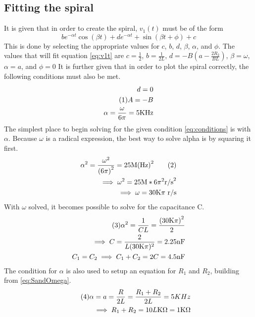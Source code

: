 \documentclass[conference]{IEEEtran}
\newcommand\numberthis{\addtocounter{equation}{1}\tag{\theequation}}
\begin{document}
\subsection{Fitting the spiral}
It is given that in order to create the spiral, $v_1(t)$ must be of the form
\begin{equation}
    be^{-\alpha{t}}\cos(\beta{t}) + de^{-\alpha{t}} + \sin(\beta{t} + \phi) + c
\end{equation}
This is done by selecting the appropriate values for $c$, $b$, $d$, $\beta$, $\alpha$, and $\phi$. The values that will fit equation \ref{eq:v1t} are $c = \frac{1}{2}$, $b = \frac{1}{2L}$, $d = -B\left(a - \frac{2R_2}{BL}\right)$, $\beta = \omega$, $\alpha = a$, and $\phi = 0$
It is further given that in order to plot the spiral correctly, the following conditions must also be met.
\begin{align*}
    d = 0\\ \numberthis \label{eq:conditions}
    A = -B\\
    \alpha = \frac{\omega}{6\pi} = 5\text{KHz}
\end{align*}
The simplest place to begin solving for the given condition \eqref{eq:conditions} is with $\alpha$. Because $\omega$ is a radical expression, the best way to solve alpha is by squaring it first.
\begin{align*}
    \alpha^2 = \frac{\omega^2}{\left(6\pi\right)^2} = 25\text{M(Hz)}^2 \numberthis \label{eq:alpha} \\
    \implies \omega^2 = 25\text{M}*6\pi^2 \text{r/s}^2 \\
    \implies \omega = 30\text{K}\pi\text{ r/s}
\end{align*}
With $\omega$ solved, it becomes possible to solve for the capacitance C.
\begin{align*} \numberthis \label{eq:C}
    \alpha^2 = \frac{1}{CL} = \frac{\left(30\text{K}\pi\right)^2 }{2}\\
    \implies C = \frac{2}{L(30\text{K}\pi)^2} = 2.25\text{nF}\\
    C_1 = C_2 \implies C_1 + C_2 = 2C = 4.5\text{nF}
\end{align*}
The condition for $\alpha$ is also used to setup an equation for $R_1$ and $R_2$, building from \eqref{eq:SandOmega}.
\begin{align*} \numberthis \label{eq:R1+R2}
    \alpha = a = \frac{R}{2L} = \frac{R_1 + R_2}{2L} = 5{KHz}\\
    \implies R_1 + R_2 = 10L\text{K}\Omega = 1\text{K}\Omega
\end{align*}
\end{document}
